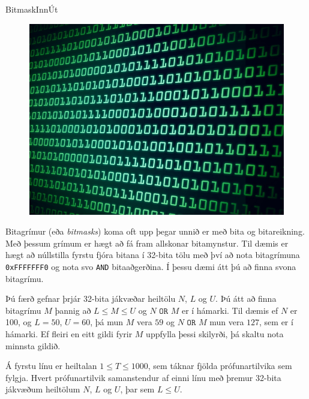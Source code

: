 \begin{problem}{Bitmask}{Inn}{Út}{~}{~}

	\begin{figure}
		\vspace{-25pt}
		\begin{center}
			\includegraphics[scale=0.22]{../Bitmask/binary.jpg}
		\end{center}
		\vspace{-30pt}
	\end{figure}

	Bitagrímur (eða \textit{bitmasks}) koma oft upp þegar unnið er með bita og bitareikning. Með þessum grímum er hægt að fá fram allskonar bitamynstur. Til dæmis er hægt að núllstilla fyrstu fjóra bitana í 32-bita tölu með því að nota bitagrímuna \texttt{0xFFFFFFF0} og nota svo \texttt{AND} bitaaðgerðina. Í þessu dæmi átt þú að finna svona bitagrímu.

	Þú færð gefnar þrjár 32-bita jákvæðar heiltölu $N$, $L$ og $U$. Þú átt að finna bitagrímu $M$ þannig að $L \leq M \leq U$ og $N \texttt{ OR } M$ er í hámarki. Til dæmis ef $N$ er 100, og $L = 50$, $U = 60$, þá mun $M$ vera $59$ og $N \texttt{ OR } M$ mun vera $127$, sem er í hámarki. Ef fleiri en eitt gildi fyrir $M$ uppfylla þessi skilyrði, þá skaltu nota minnsta gildið.

	\Input

		Á fyrstu línu er heiltalan $1 \leq T \leq 1000$, sem táknar fjölda prófunartilvika sem fylgja. Hvert prófunartilvik samanstendur af einni línu með þremur 32-bita jákvæðum heiltölum $N$, $L$ og $U$, þar sem $L \leq U$.


\end{problem}
